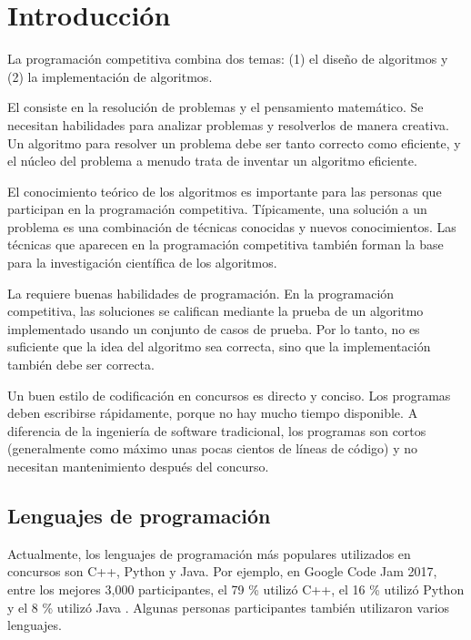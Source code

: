 \chapter{Introducción}

La programación competitiva combina dos temas:
(1) el diseño de algoritmos y (2) la implementación de algoritmos.

El  consiste en la resolución de problemas
y el pensamiento matemático.
Se necesitan habilidades para analizar problemas y resolverlos
de manera creativa.
Un algoritmo para resolver un problema
debe ser tanto correcto como eficiente,
y el núcleo del problema a menudo
trata de inventar un algoritmo eficiente.

El conocimiento teórico de los algoritmos
es importante para las personas que participan en la programación competitiva.
Típicamente, una solución a un problema es
una combinación de técnicas conocidas y
nuevos conocimientos.
Las técnicas que aparecen en la programación competitiva
también forman la base para la investigación científica
de los algoritmos.

La  requiere buenas
habilidades de programación.
En la programación competitiva, las soluciones
se califican mediante la prueba de un algoritmo implementado
usando un conjunto de casos de prueba.
Por lo tanto, no es suficiente que la idea del
algoritmo sea correcta, sino que la implementación también
debe ser correcta.

Un buen estilo de codificación en concursos es
directo y conciso.
Los programas deben escribirse rápidamente,
porque no hay mucho tiempo disponible.
A diferencia de la ingeniería de software tradicional,
los programas son cortos (generalmente como máximo unas
pocas cientos de líneas de código) y no necesitan
mantenimiento después del concurso.

\section{Lenguajes de programación}


Actualmente, los lenguajes de programación más populares
utilizados en concursos son C++, Python y Java.
Por ejemplo, en Google Code Jam 2017,
entre los mejores 3,000 participantes,
el 79 \% utilizó C++,
el 16 \% utilizó Python y
el 8 \% utilizó Java \cite{goo17}.
Algunas personas participantes también utilizaron varios lenguajes.

